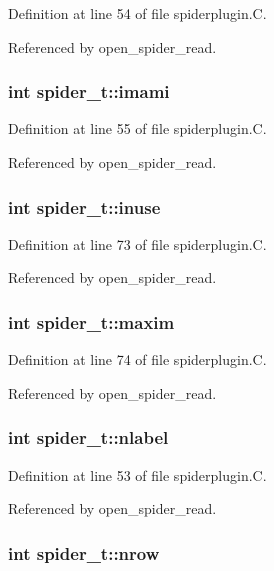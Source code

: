 Definition at line 54 of file spiderplugin.C.

Referenced by open\_\-spider\_\-read.
\subsubsection{\setlength{\rightskip}{0pt plus 5cm}int spider\_\-t::imami}\label{structspider__t_m8}




Definition at line 55 of file spiderplugin.C.

Referenced by open\_\-spider\_\-read.
\subsubsection{\setlength{\rightskip}{0pt plus 5cm}int spider\_\-t::inuse}\label{structspider__t_m26}




Definition at line 73 of file spiderplugin.C.

Referenced by open\_\-spider\_\-read.
\subsubsection{\setlength{\rightskip}{0pt plus 5cm}int spider\_\-t::maxim}\label{structspider__t_m27}




Definition at line 74 of file spiderplugin.C.

Referenced by open\_\-spider\_\-read.
\subsubsection{\setlength{\rightskip}{0pt plus 5cm}int spider\_\-t::nlabel}\label{structspider__t_m6}




Definition at line 53 of file spiderplugin.C.

Referenced by open\_\-spider\_\-read.
\subsubsection{\setlength{\rightskip}{0pt plus 5cm}int spider\_\-t::nrow}\label{structspider__t_m5}




